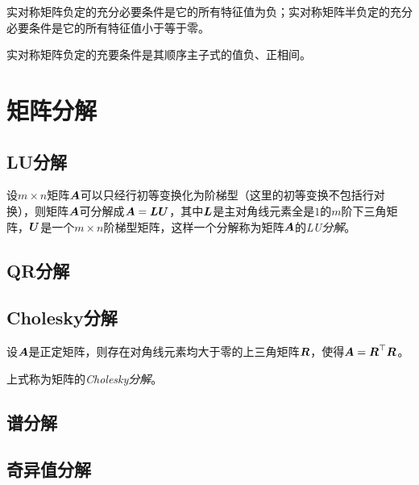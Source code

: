 \documentclass{ctexart}
\begin{document}
\begin{theorem}
    实对称矩阵负定的充分必要条件是它的所有特征值为负；实对称矩阵半负定的充分必要条件是它的所有特征值小于等于零。
\end{theorem}

\begin{theorem}
    实对称矩阵负定的充要条件是其顺序主子式的值负、正相间。
\end{theorem}

\clearpage

\section{矩阵分解}

\subsection{LU分解}

\begin{theorem}
    设\(m\times n\)矩阵\(\boldsymbol{A}\)可以只经行初等变换化为阶梯型（这里的初等变换不包括行对换），则矩阵\(\boldsymbol{A}\)可分解成\(\boldsymbol{A}=\boldsymbol{L}\boldsymbol{U}\)，其中\(\boldsymbol{L}\)是主对角线元素全是\(1\)的\(m\)阶下三角矩阵，\(\boldsymbol{U}\)是一个\(m\times n\)阶梯型矩阵，这样一个分解称为矩阵\(\boldsymbol{A}\)的\emph{LU分解}。
\end{theorem}

\subsection{QR分解}

\subsection{Cholesky分解}

\begin{theorem}[Cholesky分解]
    设\(\boldsymbol{A}\)是正定矩阵，则存在对角线元素均大于零的上三角矩阵\(\boldsymbol{R}\)，使得\(\boldsymbol{A}=\boldsymbol{R}^\top\boldsymbol{R}\)。

    上式称为矩阵的\emph{Cholesky分解}。
\end{theorem}

\subsection{谱分解}

\subsection{奇异值分解}
\end{document}

